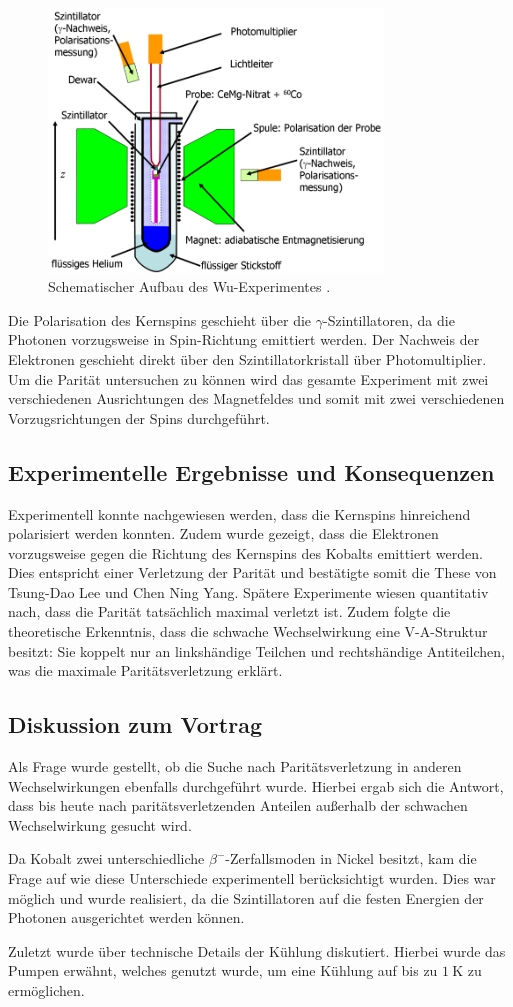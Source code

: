\begin{figure}
  \centering
  \includegraphics[height=7.0cm]{ressources/wu.png}
  \caption{Schematischer Aufbau des Wu-Experimentes \cite{wu}.}
  \label{fig:wu}
\end{figure}

Die Polarisation des Kernspins geschieht über die $\gamma$-Szintillatoren, da die Photonen vorzugsweise in Spin-Richtung emittiert werden.
Der Nachweis der Elektronen geschieht direkt über den Szintillatorkristall über Photomultiplier.
Um die Parität untersuchen zu können wird das gesamte Experiment mit zwei verschiedenen Ausrichtungen des Magnetfeldes und somit mit zwei verschiedenen Vorzugsrichtungen der Spins durchgeführt.

\subsection{Experimentelle Ergebnisse und Konsequenzen}
Experimentell konnte nachgewiesen werden, dass die Kernspins hinreichend polarisiert werden konnten.
Zudem wurde gezeigt, dass die Elektronen vorzugsweise gegen die Richtung des Kernspins des Kobalts emittiert werden.
Dies entspricht einer Verletzung der Parität und bestätigte somit die These von Tsung-Dao Lee und Chen Ning Yang.
Spätere Experimente wiesen quantitativ nach, dass die Parität tatsächlich maximal verletzt ist.
Zudem folgte die theoretische Erkenntnis, dass die schwache Wechselwirkung eine V-A-Struktur besitzt:
Sie koppelt nur an linkshändige Teilchen und rechtshändige Antiteilchen, was die maximale Paritätsverletzung erklärt.

\subsection{Diskussion zum Vortrag}
Als Frage wurde gestellt, ob die Suche nach Paritätsverletzung in anderen Wechselwirkungen ebenfalls durchgeführt wurde.
Hierbei ergab sich die Antwort, dass bis heute nach paritätsverletzenden Anteilen außerhalb der schwachen Wechselwirkung gesucht wird.

Da Kobalt zwei unterschiedliche $\beta^-$-Zerfallsmoden in Nickel besitzt, kam die Frage auf wie diese Unterschiede experimentell berücksichtigt wurden.
Dies war möglich und wurde realisiert, da die Szintillatoren auf die festen Energien der Photonen ausgerichtet werden können.

Zuletzt wurde über technische Details der Kühlung diskutiert.
Hierbei wurde das Pumpen erwähnt, welches genutzt wurde, um eine Kühlung auf bis zu $\SI{1}{\kelvin}$ zu ermöglichen.
